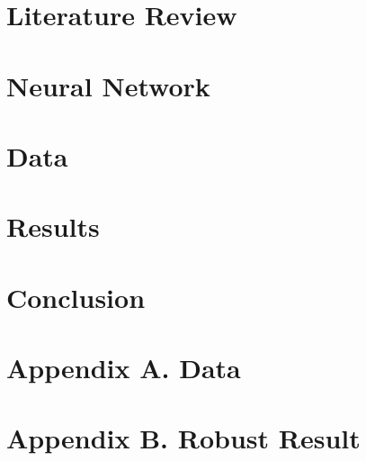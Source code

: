 \documentclass[12pt]{article}
\begin{document}
\section{Literature Review} \label{sec:literature}


\section{Neural Network} \label{sec:neural network}


\section{Data} \label{sec:data}


\section{Results} \label{sec:result}


\section{Conclusion} \label{sec:conclusion}


\clearpage
\begingroup
{}


\endgroup

\clearpage
\setcounter{figure}{0}
\setcounter{table}{0}
\renewcommand\thetable{\Alph{section}.\arabic{table}}
\renewcommand\thefigure{\Alph{section}.\arabic{figure}}

\section*{Appendix A. Data} \label{sec:appendixa}


\section*{Appendix B. Robust Result} \label{sec:appendixb}

\end{document}
